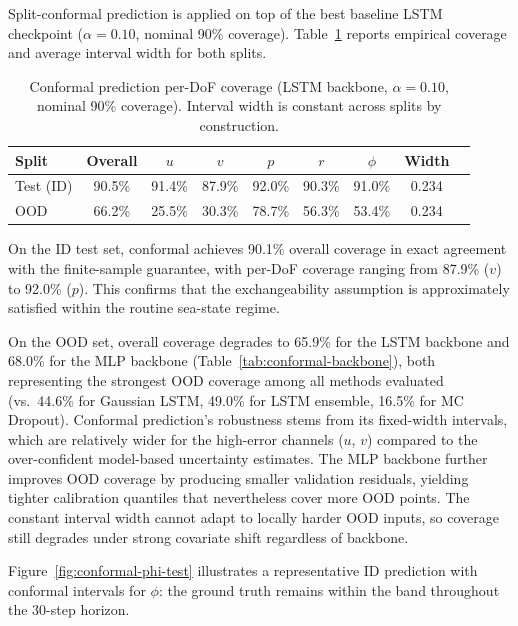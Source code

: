 \documentclass[a4paper,fleqn]{cas-sc}
\begin{document}
Split-conformal prediction is applied on top of the best baseline LSTM checkpoint ($\alpha=0.10$, nominal 90\% coverage). Table~\ref{tab:conformal} reports empirical coverage and average interval width for both splits.

\begin{table}[t]
    \centering
    \caption{Conformal prediction per-DoF coverage (LSTM backbone,
    $\alpha=0.10$, nominal 90\% coverage). Interval width is
    constant across splits by construction.}
    \label{tab:conformal}
    \begin{tabular}{lcccccccc}
        \toprule
        \textbf{Split} & \textbf{Overall} & $u$ & $v$ & $p$ & $r$ & $\phi$ & \textbf{Width} \\
        \midrule
        Test (ID) & 90.5\% & 91.4\% & 87.9\% & 92.0\% & 90.3\% & 91.0\% & 0.234 \\
        OOD       & 66.2\% & 25.5\% & 30.3\% & 78.7\% & 56.3\% & 53.4\% & 0.234 \\
        \bottomrule
    \end{tabular}
\end{table}

On the ID test set, conformal achieves 90.1\% overall coverage in exact agreement with the finite-sample guarantee, with per-DoF coverage ranging from 87.9\% ($v$) to 92.0\% ($p$). This confirms that the exchangeability assumption is approximately satisfied within the routine sea-state regime.

On the OOD set, overall coverage degrades to 65.9\% for the LSTM backbone and 
68.0\% for the MLP backbone (Table~\ref{tab:conformal-backbone}), both 
representing the strongest OOD coverage among all methods evaluated 
(vs.\ 44.6\% for Gaussian LSTM, 49.0\% for LSTM ensemble, 16.5\% for MC Dropout). 
Conformal prediction's robustness stems from its fixed-width intervals, which are 
relatively wider for the high-error channels ($u$, $v$) compared to the 
over-confident model-based uncertainty estimates. The MLP backbone further improves 
OOD coverage by producing smaller validation residuals, yielding tighter 
calibration quantiles that nevertheless cover more OOD points. The constant 
interval width cannot adapt to locally harder OOD inputs, so coverage still 
degrades under strong covariate shift regardless of backbone.

Figure~\ref{fig:conformal-phi-test} illustrates a representative ID prediction with conformal intervals for $\phi$: the ground truth remains within the band throughout the 30-step horizon.
\end{document}
